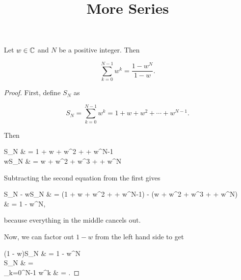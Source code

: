 \documentclass{article}
\title{More Series}
\begin{document}
\begin{theorem}\label{finite-geometric-series}
Let $w \in \mathbb{C}$ and $N$ be a positive \@{integer}. Then

\[ \sum_{k=0}^{N-1} w^k = \frac{1 - w^N}{1 - w}. \]
\end{theorem}

\begin{proof}
First, define $S_N$ as

\[ S_N = \sum_{k=0}^{N-1} w^k = 1 + w + w^2 + \cdots + w^{N-1}. \]

Then

\bal
S_N & = 1 + w + w^2 + \cdots + w^{N-1} \\
wS_N & = w + w^2 + w^3 + \cdots + w^{N}
\eal

Subtracting the second equation from the first gives

\bal
S_N - wS_N & = (1 + w + w^2 + \cdots + w^{N-1}) - (w + w^2 + w^3 + \cdots + w^{N}) \\
           & = 1 - w^N,
\eal

because everything in the middle cancels out.

Now, we can factor out $1 - w$ from the left hand side to get

\bal
(1 - w)S_N & = 1 - w^N \\
S_N & =  \\
\sum_{k=0}^{N-1} w^k & = .
\eal
\end{proof}
\end{document}
